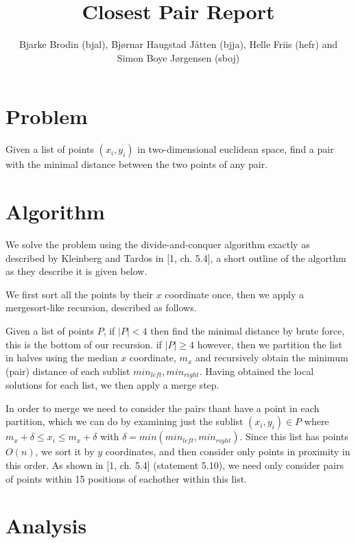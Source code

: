 \documentclass{tufte-handout}
\title{Closest Pair Report}
\author{Bjarke Brodin (bjal), Bjørnar Haugstad Jåtten (bjja), Helle Friis (hefr) and Simon Boye Jørgensen (sboj)}
\newcommand{\kleinbergtardospp}[1]{[1, #1]}
\begin{document}
  \maketitle


  \section{Problem}

  Given a list of points $(x_i,y_i)$ in two-dimensional euclidean space,
  find a pair with the minimal distance between the two points of any pair.



  \section{Algorithm}
  
  We solve the problem using the divide-and-conquer algorithm exactly as described by Kleinberg and Tardos in \kleinbergtardospp{ch. 5.4},
  a short outline of the algorthm as they describe it is given below.

  We first sort all the points by their $x$ coordinate once, 
  then we apply a mergesort-like recursion,
  described as follows.

  Given a list of points $P$,
  if $|P| < 4$ then find the minimal distance by brute force,
  this is the bottom of our recursion.
  if $|P| \ge 4$ however,
  then we partition the list in halves using the median $x$ coordinate, $m_x$
  and recursively obtain the minimum (pair) distance of each sublist 
  $min_{left}, min_{right}$.
  Having obtained the local solutions for each list,
  we then apply a merge step.
  
  In order to merge we need to consider the 
  pairs thant have a point in each partition,
  which we can do by examining just the sublist 
  $(x_i, y_i) \in P$ where $m_x + \delta \le x_i \le m_x + \delta$
  with $\delta = min(min_{left}, min_{right})$.
  Since this list has points $O(n)$,
  we sort it by $y$ coordinates,
  and then consider only points in proximity in this order.
  As shown in \kleinbergtardospp{ch. 5.4} (statement 5.10),
  we need only consider pairs of points within 15 positions of
  eachother within this list.



  \section{Analysis}
\end{document}
